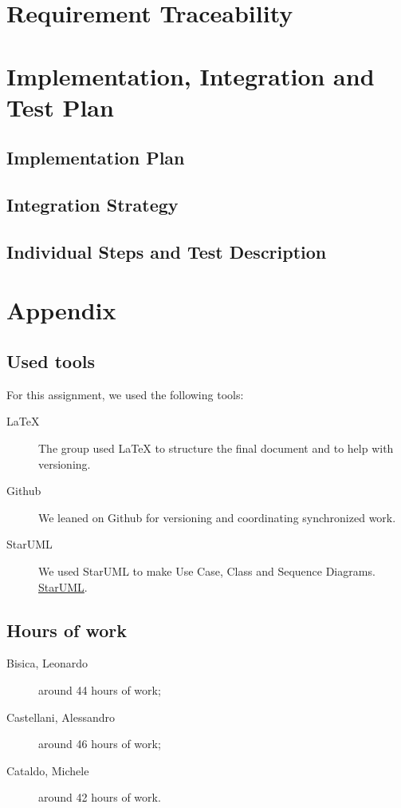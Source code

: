 \documentclass[12pt, a4paper]{article}
\begin{document}
		
	\section{Requirement Traceability}
		

	\newpage
	\section{Implementation, Integration and Test Plan}

		\subsection{Implementation Plan}
			
					
		\subsection{Integration Strategy}
			
			
		\subsection{Individual Steps and Test Description}
			

	\newpage	
	\section{Appendix}
		\listoffigures
		\listofalgorithms
		
		\subsection{Used tools}
		For this assignment, we used the following tools:
		
		\begin{description}
			\item [LaTeX] The group used LaTeX to structure the final document and to help with versioning.
			\item [Github] We leaned on Github for versioning and coordinating synchronized work.
			\item[StarUML] We used StarUML  to make Use Case, Class and Sequence Diagrams. \href{http://staruml.io/}{StarUML}.
			
		\end{description}
		
		\subsection{Hours of work}
			\begin{description}
				\item[Bisica, Leonardo] around 44 hours of work;
				\item[Castellani, Alessandro] around 46 hours of work;
				\item[Cataldo, Michele] around 42 hours of work.
			\end{description}
			
\end{document}
